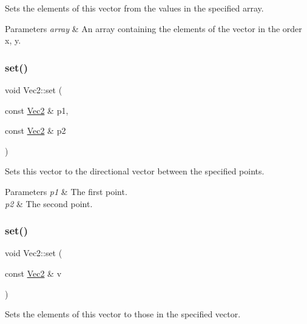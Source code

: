 Sets the elements of this vector from the values in the specified array.


\begin{DoxyParams}{Parameters}
{\em array} & An array containing the elements of the vector in the order x, y. \\
\hline
\end{DoxyParams}
\mbox{\label{classVec2_a4e76b9c6df8c81a4035107961d670caf}} 
\subsubsection{\texorpdfstring{set()}{set()}\hspace{0.1cm}{\footnotesize\ttfamily [6/8]}}
{\footnotesize\ttfamily void Vec2\+::set (\begin{DoxyParamCaption}\item[{const \hyperlink{classVec2}{Vec2} \&}]{p1,  }\item[{const \hyperlink{classVec2}{Vec2} \&}]{p2 }\end{DoxyParamCaption})\hspace{0.3cm}{\ttfamily [inline]}}

Sets this vector to the directional vector between the specified points.


\begin{DoxyParams}{Parameters}
{\em p1} & The first point. \\
\hline
{\em p2} & The second point. \\
\hline
\end{DoxyParams}
\mbox{\label{classVec2_a2c4e29e470c177b19c8f2ccaee8d6185}} 
\subsubsection{\texorpdfstring{set()}{set()}\hspace{0.1cm}{\footnotesize\ttfamily [7/8]}}
{\footnotesize\ttfamily void Vec2\+::set (\begin{DoxyParamCaption}\item[{const \hyperlink{classVec2}{Vec2} \&}]{v }\end{DoxyParamCaption})\hspace{0.3cm}{\ttfamily [inline]}}

Sets the elements of this vector to those in the specified vector.


